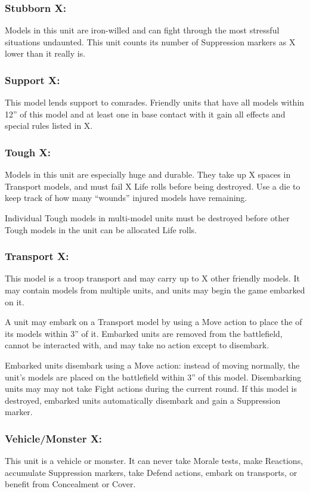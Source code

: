 \begin{multicols}{2}
\subsubsection*{Stubborn X:} Models in this unit are iron-willed and can fight through the most stressful situations undaunted. This unit counts its number of Suppression markers as X lower than it really is.

\subsubsection*{Support X:} This model lends support to comrades. Friendly units that have all models within 12'' of this model and at least one in base contact with it gain all effects and special rules listed in X.

\subsubsection*{Tough X:} Models in this unit are especially huge and durable. They take up X spaces in Transport models, and must fail X Life rolls before being destroyed. Use a die to keep track of how many ``wounds'' injured models have remaining.

Individual Tough models in multi-model units must be destroyed before other Tough models in the unit can be allocated Life rolls.

\subsubsection*{Transport X:} This model is a troop transport and may carry up to X other friendly models. It may contain models from multiple units, and units may begin the game embarked on it.

A unit may embark on a Transport model by using a Move action to place the of its models within 3'' of it. Embarked units are removed from the battlefield, cannot be interacted with, and may take no action except to disembark.

Embarked units disembark using a Move action: instead of moving normally, the unit's models are placed on the battlefield within 3'' of this model. Disembarking units may may not take Fight actions during the current round. If this model is destroyed, embarked units automatically disembark and gain a Suppression marker.

\subsubsection*{Vehicle/Monster X:} This unit is a vehicle or monster. It can never take Morale tests, make Reactions, accumulate Suppression markers, take Defend actions, embark on transports, or benefit from Concealment or Cover.


\end{multicols}
